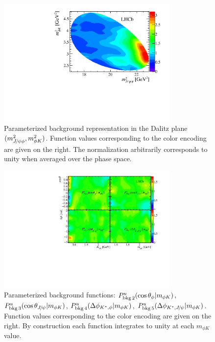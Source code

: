 \begin{figure}[bthp]
  \begin{center}
    \includegraphics[width=0.8\textwidth]{Figures/03_Zcs/05_Likelihood/bkgm1m2}
  \end{center}
  \vskip-0.3cm\caption{
     Parameterized background representation in the Dalitz plane $({m_{{{J\mskip -3mu/\mskip -2mu\psi}}\phi}^2},{m_{\phi{\ensuremath{K}}}^2})$.
     Function values corresponding to the color encoding are given on the right.
     The normalization arbitrarily corresponds to unity when averaged over the phase space.
  \label{fig:bkgdaleffs}
  }
\end{figure}


\begin{figure}[tbhp]
  \begin{center}
    \includegraphics[width=0.8\textwidth]{Figures/03_Zcs/05_Likelihood/bkgAngles} 
  \end{center}
  \vskip-0.3cm\caption{
     Parameterized background functions: $P^u_{\rm bkg\,2}(\cos\theta_{\phi}|m_{\phi{\ensuremath{K}}})$,
     $P^u_{\rm bkg\,3}(\cos\theta_{{{J\mskip -3mu/\mskip -2mu\psi}}}|m_{\phi{\ensuremath{K}}})$, $P^u_{\rm bkg\,4}(\Delta{\phi}_{{{K}^*},\phi}|m_{\phi{\ensuremath{K}}})$,
     $P^u_{\rm bkg\,5}(\Delta{\phi}_{{{K}^*},{{J\mskip -3mu/\mskip -2mu\psi}}}|m_{\phi{\ensuremath{K}}})$.
     Function values corresponding to the color encoding are given on the right.
     By construction each function integrates to unity at each $m_{\phi K}$ value.  
  \label{fig:bkgeffs2345}
  }
\end{figure}

